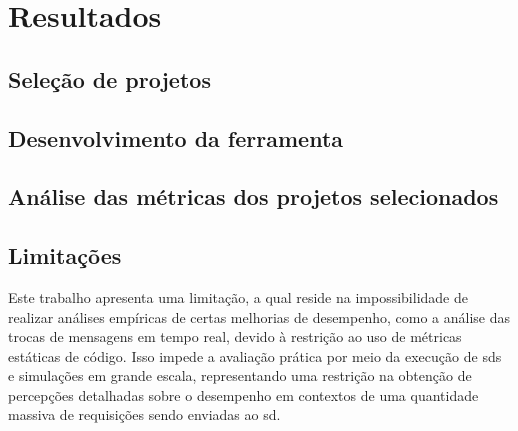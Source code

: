 \chapter{Resultados}
\label{chapter:results}

\section{Seleção de projetos}


\section{Desenvolvimento da ferramenta}


\section{Análise das métricas dos projetos selecionados}



\section{Limitações}
\label{sec:limitacoes}
Este trabalho apresenta uma limitação, a qual reside na impossibilidade de realizar análises empíricas de certas melhorias de desempenho, como a análise das trocas de mensagens em tempo real, devido à restrição ao uso de métricas estáticas de código. Isso impede a avaliação prática por meio da execução de \gls{sds} e simulações em grande escala, representando uma restrição na obtenção de percepções detalhadas sobre o desempenho em contextos de uma quantidade massiva de requisições sendo enviadas ao \gls{sd}.
